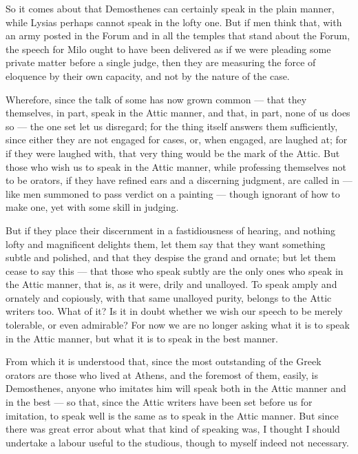  So it comes about that Demosthenes can certainly speak in the plain manner, while Lysias perhaps cannot speak in the lofty one. But if men think that, with an army posted in the Forum and in all the temples that stand about the Forum, the speech for Milo ought to have been delivered as if we were pleading some private matter before a single judge, then they are measuring the force of eloquence by their own capacity, and not by the nature of the case.

 Wherefore, since the talk of some has now grown common --- that they themselves, in part, speak in the Attic manner, and that, in part, none of us does so --- the one set let us disregard; for the thing itself answers them sufficiently, since either they are not engaged for cases, or, when engaged, are laughed at; for if they were laughed with, that very thing would be the mark of the Attic. But those who wish us to speak in the Attic manner, while professing themselves not to be orators, if they have refined ears and a discerning judgment, are called in --- like men summoned to pass verdict on a painting --- though ignorant of how to make one, yet with some skill in judging.

 But if they place their discernment in a fastidiousness of hearing, and nothing lofty and magnificent delights them, let them say that they want something subtle and polished, and that they despise the grand and ornate; but let them cease to say this --- that those who speak subtly are the only ones who speak in the Attic manner, that is, as it were, drily and unalloyed. To speak amply and ornately and copiously, with that same unalloyed purity, belongs to the Attic writers too. What of it? Is it in doubt whether we wish our speech to be merely tolerable, or even admirable? For now we are no longer asking what it is to speak in the Attic manner, but what it is to speak in the best manner.

 From which it is understood that, since the most outstanding of the Greek orators are those who lived at Athens, and the foremost of them, easily, is Demosthenes, anyone who imitates him will speak both in the Attic manner and in the best --- so that, since the Attic writers have been set before us for imitation, to speak well is the same as to speak in the Attic manner. But since there was great error about what that kind of speaking was, I thought I should undertake a labour useful to the studious, though to myself indeed not necessary.

